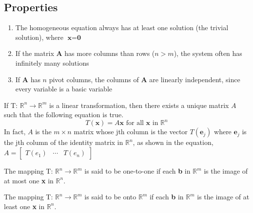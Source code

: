 \documentclass{article}
\begin{document}
\subsection*{Properties}
\begin{enumerate}
    \item The homogeneous equation always has at least one solution (the trivial solution), where $\textbf{x}=\textbf{0}$
    \item If the matrix $\textbf{A}$ has more columns than rows ($n > m$), the system often has infinitely many solutions
    \item If $\textbf{A}$ has $n$ pivot columns, the columns of $\textbf{A}$ are linearly independent, since every variable is a basic variable
\end{enumerate}

If T: $\mathbb{R}^n\rightarrow\mathbb{R}^m$ is a linear transformation, then there exists a unique matrix $A$ such that the following equation is true.
\[T(\textbf{x})=A\textbf{x}\text{ for all } \textbf{x} \text{ in } \mathbb{R}^n\]
In fact, $A$ is the $m\times n$ matrix whose jth column is the vector $T(\textbf{e}_j)$ where $\textbf{e}_j$ is the jth column of the identity matrix in $\mathbb{R}^n$, as shown in the equation, $A=\begin{bmatrix}
    T(e_1) & \cdots & T(e_n)
\end{bmatrix}$

The mapping T: $\mathbb{R}^n\rightarrow\mathbb{R}^m$ is said to be one-to-one if each \textbf{b} in $\mathbb{R}^m$ is the image of at most one \textbf{x} in $\mathbb{R}^n$.

The mapping T: $\mathbb{R}^n\rightarrow\mathbb{R}^m$ is said to be onto $\mathbb{R}^m$ if each \textbf{b} in $\mathbb{R}^m$ is the image of at least one \textbf{x} in $\mathbb{R}^n$.
\end{document}
